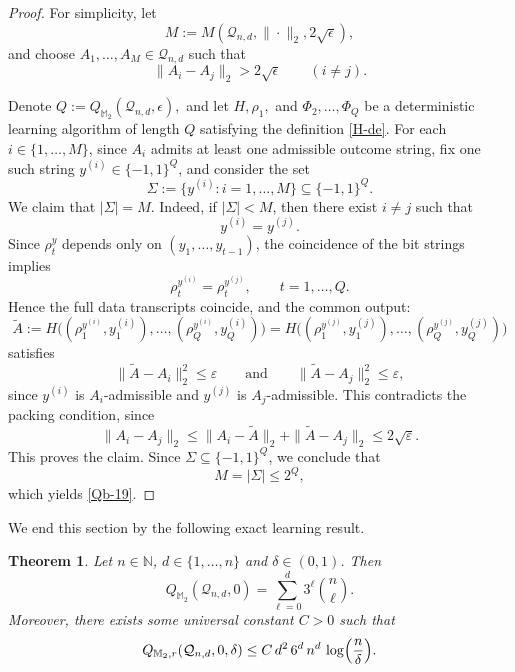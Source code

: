 \documentclass{amsbook}
\newtheorem{theorem}{Theorem}[chapter]
\theoremstyle{definition}
\theoremstyle{remark}
\numberwithin{section}{chapter}
\numberwithin{equation}{chapter}
\newcommand{\M}{\mathbb{M}}
\newcommand{\1}{\mathbf{1}}
\begin{document}
\begin{proof}
For simplicity, let
	\[
	M:=M(\mathcal Q_{n,d},\|\cdot\|_2,2\sqrt{\epsilon}),
	\]
	and choose $A_1,\dots,A_M\in\mathcal Q_{n,d}$ such that
	\[
	\|A_i-A_j\|_2>2\sqrt{\epsilon}
	\qquad (i\neq j).
	\]
	 
	 Denote $Q:=Q_{\M_2}(\mathcal Q_{n,d},\epsilon),$
	and let $H,\rho_1,$ and $\Phi_2,\dots,\Phi_Q$ be a deterministic    learning algorithm of length
	$Q$ satisfying the definition \eqref{H-de}. For each $i \in \{1, \dots, M\}$, since $A_i$ admits at least one admissible outcome string, fix one such string $y^{(i)} \in \{-1,1\}^Q$, and consider the set
	\[
	\Sigma:=\{y^{(i)}:i=1,\dots,M\}\subseteq\{-1,1\}^Q.
	\]
	We claim that $|\Sigma|=M$.
	Indeed, if $|\Sigma|<M$, then there exist $i\neq j$ such that
	\[
	y^{(i)}=y^{(j)}.
	\]
	Since $\rho_t^y$ depends only on  $(y_1, \dots, y_{t-1})$, the coincidence of the bit strings implies
	\[
	\rho_t^{y^{(i)}}=\rho_t^{y^{(j)}},
	\qquad t=1,\dots,Q.
	\]
	Hence the full data transcripts coincide, and the common output:
	\[
	\widetilde A:=H\big((\rho_1^{y^{(i)}},y^{(i)}_1),\dots,(\rho_Q^{y^{(i)}},y^{(i)}_Q)\big)=H\big((\rho_1^{y^{(j)}},y^{(j)}_1),\dots,(\rho_Q^{y^{(j)}},y^{(j)}_Q)\big)
	\]
	satisfies
	\[
	\|\widetilde A-A_i\|_2^2\le \varepsilon
	\qquad\text{and}\qquad
	\|\widetilde A-A_j\|_2^2\le \varepsilon,
	\]
	since $y^{(i)}$ is $A_i$-admissible and $y^{(j)}$ is $A_j$-admissible. This contradicts the packing condition, since
	\[
	\|A_i-A_j\|_2
	\le \|A_i-\widetilde A\|_2+\|\widetilde A-A_j\|_2
	\le 2\sqrt{\varepsilon}.
	\]
	This proves the claim. Since $\Sigma\subseteq\{-1,1\}^Q$, we conclude that
	\[
	M=|\Sigma|\le 2^Q,
	\]
	which yields \eqref{Qb-19}.
\end{proof}



We end this section by the following exact learning result.  
\begin{theorem}\label{exact-lea-thm10}
	Let $n\in\mathbb N$, $d\in\{1,\dots,n\}$ and $\delta\in(0,1)$.
	Then
	\begin{equation}\label{exac-Q}
	Q_{\M_2}(\mathcal Q_{n,d},0)
	=\sum_{\ell=0}^d 3^\ell \binom{n}{\ell}.
	\end{equation}
	Moreover, there exists some universal constant $C>0$ such that
\begin{equation}\label{exac-Qr}
	Q_{\M_2,r}(\mathcal Q_{n,d},0,\delta)
	\le
	C\,d^2\,6^d\,n^d\,\log \Bigl(\frac{n}{\delta}\Bigr).
\end{equation}	
\end{theorem}
\end{document}
